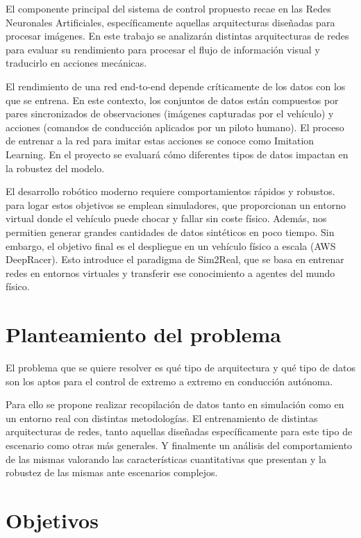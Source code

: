 \documentclass[12pt,a4paper,onecolumn,oneside]{report}
\begin{document}
El componente principal del sistema de control propuesto recae en las Redes Neuronales Artificiales, específicamente aquellas arquitecturas diseñadas para procesar imágenes. En este trabajo se analizarán distintas arquitecturas de redes para evaluar su rendimiento para procesar el flujo de información visual y traducirlo en acciones mecánicas.

El rendimiento de una red end-to-end depende críticamente de los datos con los que se entrena. En este contexto, los conjuntos de datos están compuestos por pares sincronizados de observaciones (imágenes capturadas por el vehículo) y acciones (comandos de conducción aplicados por un piloto humano). El proceso de entrenar a la red para imitar estas acciones se conoce como Imitation Learning. En el proyecto se evaluará cómo diferentes tipos de datos impactan en la robustez del modelo.

El desarrollo robótico moderno requiere comportamientos rápidos y robustos. para logar estos objetivos se emplean simuladores, que proporcionan un entorno virtual donde el vehículo puede chocar y fallar sin coste físico. Además, nos permitien generar grandes cantidades de datos sintéticos en poco tiempo. Sin embargo, el objetivo final es el despliegue en un vehículo físico a escala (AWS DeepRacer). Esto introduce el paradigma de Sim2Real, que se basa en entrenar redes en entornos virtuales y transferir ese conocimiento a agentes del mundo físico.

\section*{Planteamiento del problema}

El problema que se quiere resolver es qué tipo de arquitectura y qué tipo de datos son los aptos para el control de extremo a extremo en conducción autónoma. 

Para ello se propone realizar recopilación de datos tanto en simulación como en un entorno real con distintas metodologías. 
El entrenamiento de  distintas arquitecturas de redes, tanto aquellas diseñadas específicamente para este tipo de escenario como otras más generales. 
Y finalmente un análisis del comportamiento de las mismas valorando las características cuantitativas que presentan y la robustez de las mismas ante escenarios complejos.

\section*{Objetivos}
\end{document}
